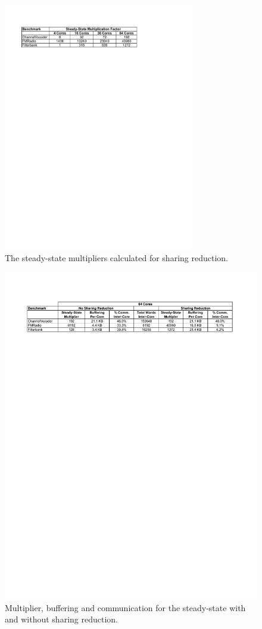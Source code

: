 \begin{figure}[t]
\centering
\includegraphics[width=3.3in]{figures/mult-table.pdf}
\caption{\label{fig:mult-table}  The steady-state multipliers calculated for
sharing reduction.}
\end{figure}

\begin{figure}[t]
\centering
\includegraphics[width=6in]{figures/64-core-table.pdf}
\caption{ Multiplier, buffering and communication for the steady-state with and without
sharing reduction. 
\label{fig:fission-table}}
\end{figure}

